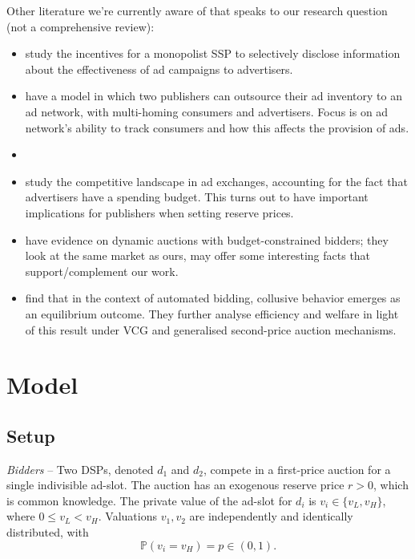\documentclass[11pt]{article}
\theoremstyle{plain}
\theoremstyle{definition}
\theoremstyle{plain}
\theoremstyle{plain}
\theoremstyle{plain}
\theoremstyle{plain}
\numberwithin{equation}{section}
\begin{document}
\noindent Other literature we're currently aware of that speaks to our research question (not a comprehensive review):
\begin{itemize}
    \item \textcite{dannunzio_intermediaries_2024} study the incentives for a monopolist SSP to selectively disclose information about the effectiveness of ad campaigns to advertisers.
    \item \textcite{dannunzio_ad_2020} have a model in which two publishers can outsource their ad inventory to an ad network, with multi-homing consumers and advertisers. Focus is on ad network's ability to track consumers and how this affects the provision of ads.
    \item \textcite{sayedi_real-time_2018}
    \item \textcite{balseiro_repeated_2015} study the competitive landscape in ad exchanges, accounting for the fact that advertisers have a spending budget. This turns out to have important implications for publishers when setting reserve prices.
    \item \textcite{kobayashi_dynamic_2023} have evidence on dynamic auctions with budget-constrained bidders; they look at the same market as ours, may offer some interesting facts that support/complement our work.
    \item \textcite{decarolis_marketing_2020} find that in the context of automated bidding, collusive behavior emerges as an equilibrium outcome. They further analyse efficiency and welfare in light of this result under VCG and generalised second-price auction mechanisms.
\end{itemize}

\fi 
 
\section{Model}\label{baseline-model}
\subsection{Setup}

\noindent \textit{Bidders} -- Two DSPs, denoted $ d_1 $ and $ d_2 $, compete in a first-price auction for a single indivisible ad-slot. The auction has an exogenous reserve price $ r > 0 $, which is common knowledge. The private value of the ad-slot for $ d_i $ is $ v_i \in \{ v_L, v_H \} $, where $ 0 \leq v_L < v_H $. Valuations $ v_1, v_2 $ are independently and identically distributed, with
\begin{equation*}
 \mathbb{P}(v_i = v_H) = p \in (0,1).
\end{equation*}
\end{document}
